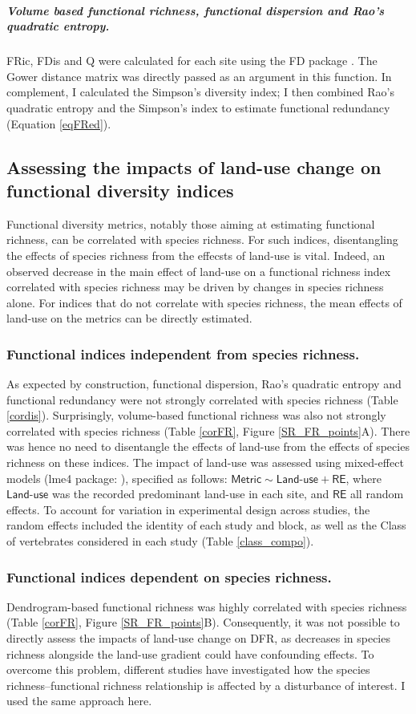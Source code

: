 \subparagraph{Volume based functional richness, functional dispersion and Rao's quadratic entropy.} FRic, FDis and Q were calculated for each site using the FD package \citep{Laliberte2015}. The Gower distance matrix was directly passed as an argument in this function. In complement, I calculated the Simpson's diversity index; I then combined Rao's quadratic entropy and the Simpson's index to estimate functional redundancy (Equation \ref{eqFRed}). 

\subsection{Assessing the impacts of land-use change on functional diversity indices}

Functional diversity metrics, notably those aiming at estimating functional richness, can be correlated with species richness. For such indices, disentangling the effects of species richness from the effecsts of land-use is vital. Indeed, an observed decrease in the main effect of land-use on a functional richness index correlated with species richness may be driven by changes in species richness alone. For indices that do not correlate with species richness, the mean effects of land-use on the metrics can be directly estimated.

	\subsubsection{Functional indices independent from species richness.}
As expected by construction, functional dispersion, Rao's quadratic entropy and functional redundancy were not strongly correlated with species richness (Table \ref{cordis}). Surprisingly, volume-based functional richness was also not strongly correlated with species richness (Table \ref{corFR}, Figure \ref{SR_FR_points}A). There was hence no need to disentangle the effects of land-use from the effects of species richness on these indices. The impact of land-use was assessed using mixed-effect models (lme4 package: \citet{lme4}), specified as follows: $\textsf{Metric} \sim \textsf{Land-use} + \textsf{RE}$, where $\textsf{Land-use}$ was the recorded predominant land-use in each site, and $\textsf{RE}$ all random effects. To account for variation in experimental design across studies, the random effects included the identity of each study and block, as well as the Class of vertebrates considered in each study (Table \ref{class_compo}).

	\subsubsection{Functional indices dependent on species richness.}
Dendrogram-based functional richness was highly correlated with species richness (Table \ref{corFR}, Figure \ref{SR_FR_points}B). Consequently, it was not possible to directly assess the impacts of land-use change on DFR, as decreases in species richness alongside the land-use gradient could have confounding effects. To overcome this problem, different studies have investigated how the species richness--functional richness relationship is affected by a disturbance of interest. I used the same approach here.

